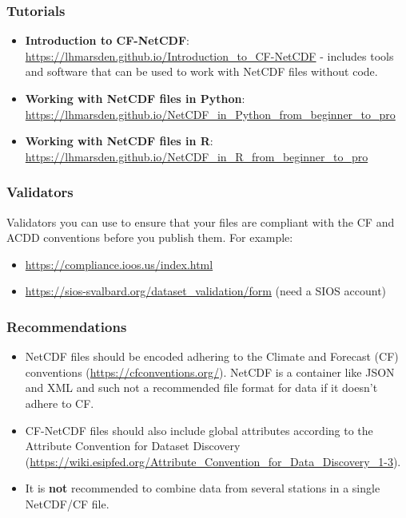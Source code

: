 \documentclass[a4paper,12pt]{article}
\begin{document}
\subsubsection{Tutorials}

\begin{itemize}
    \item \textbf{Introduction to CF-NetCDF}: \url{https://lhmarsden.github.io/Introduction_to_CF-NetCDF} - includes tools and software that can be used to work with NetCDF files without code.
    \item \textbf{Working with NetCDF files in Python}: \url{https://lhmarsden.github.io/NetCDF_in_Python_from_beginner_to_pro} \citep{marsden_netcdf_python}
    \item \textbf{Working with NetCDF files in R}: \url{https://lhmarsden.github.io/NetCDF_in_R_from_beginner_to_pro} \citep{marsden_netcdf_r}
\end{itemize}

\subsubsection{Validators}

Validators you can use to ensure that your files are compliant with the CF and ACDD conventions before you publish them. For example:
\begin{itemize}
    \item \url{https://compliance.ioos.us/index.html}
    \item \url{https://sios-svalbard.org/dataset_validation/form} (need a SIOS account)
\end{itemize}

\subsubsection{Recommendations}
\begin{itemize}
\item NetCDF files should be encoded adhering to the Climate and Forecast (CF) conventions (\url{https://cfconventions.org/}). NetCDF is a container like JSON and XML and such not a recommended file format for data if it doesn't adhere to CF.
\item CF-NetCDF files should also include global attributes according to the
Attribute Convention for Dataset Discovery (\url{https://wiki.esipfed.org/Attribute_Convention_for_Data_Discovery_1-3}).
\item It is \textbf{not} recommended to combine data from several stations in
a single NetCDF/CF file.
\end{itemize}
\end{document}
